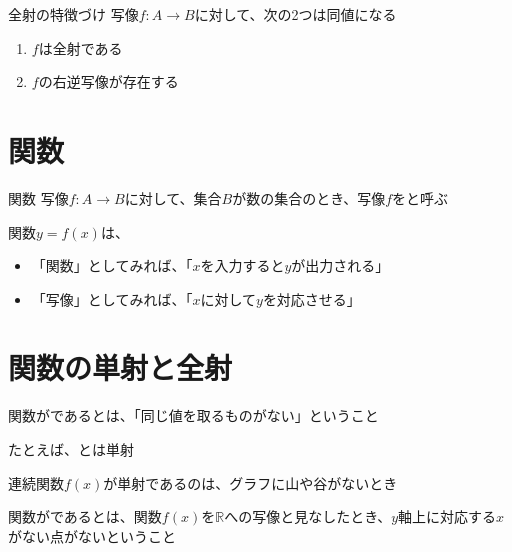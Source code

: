 \documentclass[b5paper,12pt]{jsarticle}
\begin{document}
\begin{theorem}{全射の特徴づけ}
  写像$f\colon A \to B$に対して、次の2つは同値になる
  \begin{enumerate}
    \item $f$は全射である
    \item $f$の右逆写像が存在する
  \end{enumerate}
\end{theorem}

\sectionline
\section{関数}

\begin{definition}{関数}
  写像$f\colon A \to B$に対して、集合$B$が数の集合のとき、写像$f$をと呼ぶ
\end{definition}

関数$y=f(x)$は、
\begin{itemize}
  \item 「関数」としてみれば、「$x$を入力すると$y$が出力される」
  \item 「写像」としてみれば、「$x$に対して$y$を対応させる」
\end{itemize}

\sectionline
\section{関数の単射と全射}

関数がであるとは、「同じ値を取るものがない」ということ

たとえば、とは単射

連続関数$f(x)$が単射であるのは、グラフに山や谷がないとき

\sectionline

関数がであるとは、関数$f(x)$を$\mathbb{R}$への写像と見なしたとき、$y$軸上に対応する$x$がない点がないということ
\end{document}
